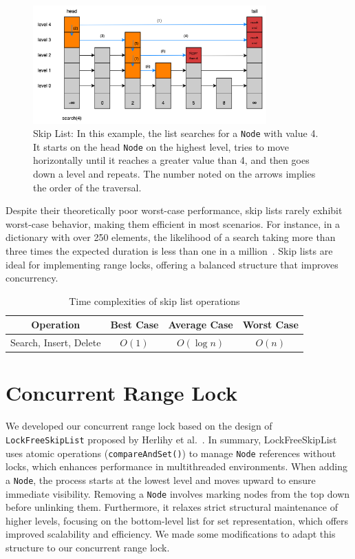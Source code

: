 \begin{figure}[h]
    \centering
    \includegraphics[width=0.8\textwidth]{./figures/skiplistsearch}
    \caption{Skip List: In this example, the list searches for a \texttt{Node} with value 4. It starts on the head \texttt{Node} on the highest level, tries to move horizontally until it reaches a greater value than 4, and then goes down a level and repeats. The number noted on the arrows implies the order of the traversal.}
    \label{fig:skiplistsearch}
\end{figure}

Despite their theoretically poor worst-case performance, skip lists rarely exhibit worst-case behavior, making them efficient in most scenarios.
For instance, in a dictionary with over 250 elements, the likelihood of a search taking more than three times the expected duration is less than one in a million~\parencite{pugh1990skip2}.
Skip lists are ideal for implementing range locks, offering a balanced structure that improves concurrency.

\begin{table}[h!]
    \centering
    \begin{tabular}{|c|c|c|c|}
        \hline
        \textbf{Operation} & \textbf{Best Case} & \textbf{Average Case} & \textbf{Worst Case} \\ \hline
 Search, Insert, Delete & $O(1)$ & $O(\log n)$ & $O(n)$ \\ \hline
    \end{tabular}
    \caption{Time complexities of skip list operations}
    \label{tab:skiplisttimecomplexity}
\end{table}

\newpage

\section{Concurrent Range Lock}\label{sec:concurrent-range-lock}
We developed our concurrent range lock based on the design of \texttt{LockFreeSkipList} proposed by Herlihy et al.~\parencite{herlihy2020art}.
In summary, LockFreeSkipList uses atomic operations (\texttt{compareAndSet()}) to manage \texttt{Node} references without locks, which enhances performance in multithreaded environments.
When adding a \texttt{Node}, the process starts at the lowest level and moves upward to ensure immediate visibility.
Removing a \texttt{Node} involves marking nodes from the top down before unlinking them.
Furthermore, it relaxes strict structural maintenance of higher levels, focusing on the bottom-level list for set representation, which offers improved scalability and efficiency.
We made some modifications to adapt this structure to our concurrent range lock.


